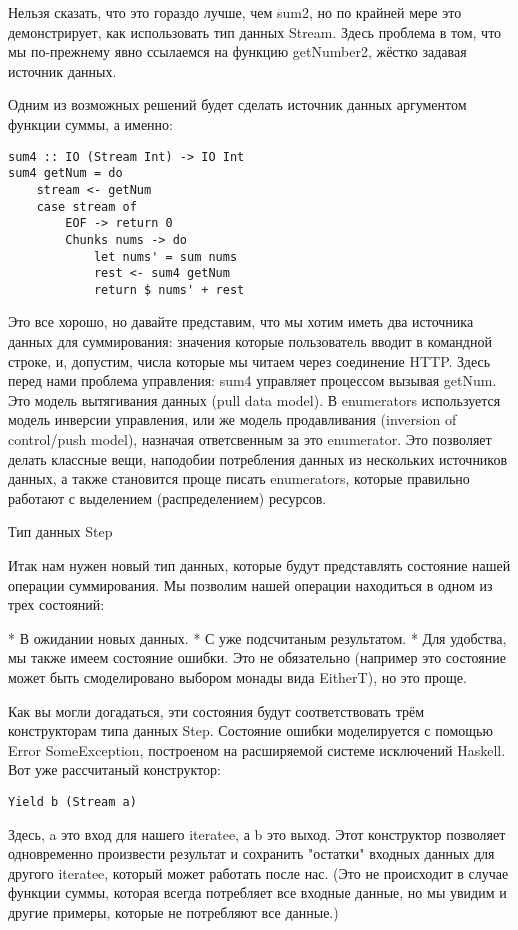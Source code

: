 Нельзя сказать, что это гораздо лучше, чем sum2, но по крайней мере это демонстрирует, как использовать тип данных Stream. Здесь проблема в том, что мы по-прежнему явно ссылаемся на функцию getNumber2, жёстко задавая источник данных.

Одним из возможных решений будет сделать источник данных аргументом функции суммы, а именно:

\begin{lstlisting}
sum4 :: IO (Stream Int) -> IO Int
sum4 getNum = do
    stream <- getNum
    case stream of
        EOF -> return 0
        Chunks nums -> do
            let nums' = sum nums
            rest <- sum4 getNum
            return $ nums' + rest
\end{lstlisting}

Это все хорошо, но давайте представим, что мы хотим иметь два источника данных для суммирования: значения которые пользователь вводит в командной строке, и,  допустим, числа которые мы читаем через соединение HTTP. Здесь перед нами проблема управления: sum4 управляет процессом вызывая getNum. Это модель вытягивания данных (pull data model). В enumerators используется модель инверсии управления, или же модель продавливания (inversion of control/push model), назначая ответсвенным за это enumerator. Это позволяет делать классные вещи, наподобии потребления данных из нескольких источников данных, а также становится проще писать enumerators, которые правильно работают с выделением (распределением) ресурсов.

Тип данных Step

Итак нам нужен новый тип данных, которые будут представлять состояние нашей операции суммирования. Мы позволим нашей операции находиться в одном из трех состояний:

* В ожидании новых данных.
* С уже подсчитаным результатом.
* Для удобства, мы также имеем состояние ошибки. Это не обязательно (например это состояние может быть смоделировано выбором монады вида EitherT), но это проще.

Как вы могли догадаться, эти состояния будут соответствовать трём конструкторам типа данных Step. Состояние ошибки моделируется с помощью Error SomeException, построеном на расширяемой системе исключений Haskell. Вот уже рассчитаный конструктор:

\begin{lstlisting}
Yield b (Stream a)
\end{lstlisting}

Здесь, a это вход для нашего iteratee, а b это выход. Этот конструктор позволяет одновременно произвести результат и сохранить "остатки" входных данных для другого iteratee, который может работать после нас. (Это не происходит в случае функции суммы, которая всегда потребляет все входные данные, но мы увидим и другие примеры, которые не потребляют все данные.)

